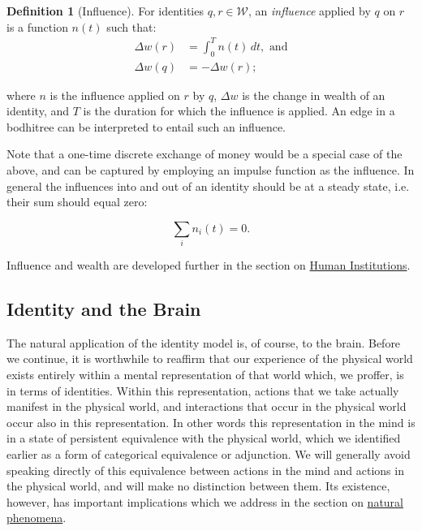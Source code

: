 \documentclass[pra,twocolumn,groupedaddress,10pt]{revtex4}
\theoremstyle{definition}
\newtheorem{defn}{Definition}[section]
\begin{document}
\begin{defn}[Influence]
	For identities $q, r \in \mathcal{W}$, an \emph{influence} applied by $q$ on $r$ is a function $n(t)$ such that:
	\begin{equation}
		\begin{split}
			\Delta w(r) &= \! \int_{0}^{T} n(t)\,dt \label{eq:influence}, \text{ and} \\
			\Delta w(q) &= - \Delta w(r) ;
		\end{split}
	\end{equation}

	where $n$ is the influence applied on $r$ by $q$, $\Delta w$ is the change in wealth of an identity, and $T$ is the duration for which the influence is applied. An edge in a bodhitree can be interpreted to entail such an influence.

\end{defn}

Note that a one-time discrete exchange of money would be a special case of the above, and can be captured by employing an impulse function as the influence. In general the influences into and out of an identity should be at a steady state, i.e. their sum should equal zero:

\begin{equation}
	\sum_{i} n_i(t) = 0 .
\end{equation}

Influence and wealth are developed further in the section on \hyperref[sec:humins]{Human Institutions}.

\subsection{Identity and the Brain} \label{sec:idebra}

The natural application of the identity model is, of course, to the brain. Before we continue, it is worthwhile to reaffirm that our experience of the physical world exists entirely within a mental representation of that world which, we proffer, is in terms of identities. Within this representation, actions that we take actually manifest in the physical world, and interactions that occur in the physical world occur also in this representation. In other words this representation in the mind is in a state of persistent equivalence with the physical world, which we identified earlier as a form of categorical equivalence or adjunction. We will generally avoid speaking directly of this equivalence between actions in the mind and actions in the physical world, and will make no distinction between them. Its existence, however, has important implications which we address in the section on \hyperref[sec:natphe]{natural phenomena}.
\end{document}
